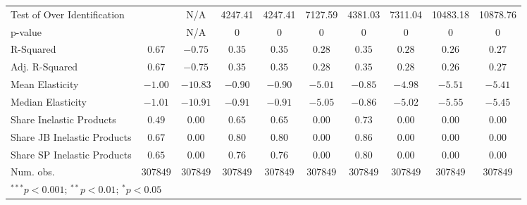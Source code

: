 \begin{tabular}{l c c c c c c c c c}
Test of Over Identification &               & N/A           & 4247.41       & 4247.41       & 7127.59       & 4381.03       & 7311.04       & 10483.18      & 10878.76      \\
p-value                     &               & N/A           & 0             & 0             & 0             & 0             & 0             & 0             & 0             \\
R-Squared                   & $0.67$        & $-0.75$       & $0.35$        & $0.35$        & $0.28$        & $0.35$        & $0.28$        & $0.26$        & $0.27$        \\
Adj. R-Squared              & $0.67$        & $-0.75$       & $0.35$        & $0.35$        & $0.28$        & $0.35$        & $0.28$        & $0.26$        & $0.27$        \\
Mean Elasticity             & $-1.00$       & $-10.83$      & $-0.90$       & $-0.90$       & $-5.01$       & $-0.85$       & $-4.98$       & $-5.51$       & $-5.41$       \\
Median Elasticity           & $-1.01$       & $-10.91$      & $-0.91$       & $-0.91$       & $-5.05$       & $-0.86$       & $-5.02$       & $-5.55$       & $-5.45$       \\
Share Inelastic Products    & $0.49$        & $0.00$        & $0.65$        & $0.65$        & $0.00$        & $0.73$        & $0.00$        & $0.00$        & $0.00$        \\
Share JB Inelastic Products & $0.67$        & $0.00$        & $0.80$        & $0.80$        & $0.00$        & $0.86$        & $0.00$        & $0.00$        & $0.00$        \\
Share SP Inelastic Products & $0.65$        & $0.00$        & $0.76$        & $0.76$        & $0.00$        & $0.80$        & $0.00$        & $0.00$        & $0.00$        \\
Num. obs.                   & $307849$      & $307849$      & $307849$      & $307849$      & $307849$      & $307849$      & $307849$      & $307849$      & $307849$      \\
\bottomrule
\multicolumn{10}{l}{\scriptsize{$^{***}p<0.001$; $^{**}p<0.01$; $^{*}p<0.05$}}
\end{tabular}

